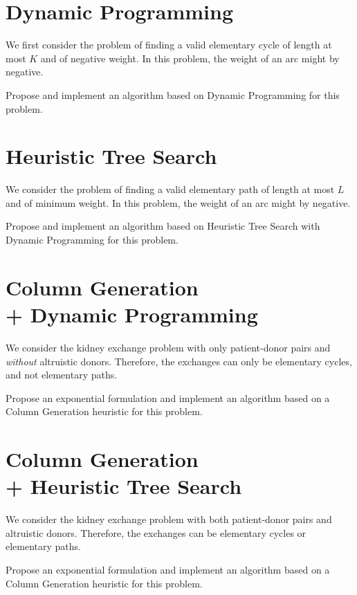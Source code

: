 \documentclass[a4paper,twocolumn]{article}
\begin{document}
\section{Dynamic Programming}

We first consider the problem of finding a valid elementary cycle of length at most $K$ and of negative weight. In this problem, the weight of an arc might by negative.

Propose and implement an algorithm based on Dynamic Programming for this problem.

\section{Heuristic Tree Search}

We consider the problem of finding a valid elementary path of length at most $L$ and of minimum weight. In this problem, the weight of an arc might by negative.

Propose and implement an algorithm based on Heuristic Tree Search with Dynamic Programming for this problem.

\section{Column Generation \texorpdfstring{\\}{}  + Dynamic Programming}

We consider the kidney exchange problem with only patient-donor pairs and \emph{without} altruistic donors. Therefore, the exchanges can only be elementary cycles, and not elementary paths.

Propose an exponential formulation and implement an algorithm based on a Column Generation heuristic for this problem.

\section{Column Generation \texorpdfstring{\\}{} + Heuristic Tree Search}

We consider the kidney exchange problem with both patient-donor pairs and altruistic donors. Therefore, the exchanges can be elementary cycles or elementary paths.

Propose an exponential formulation and implement an algorithm based on a Column Generation heuristic for this problem.

\printbibliography%
\end{document}
